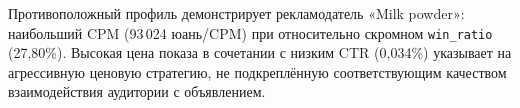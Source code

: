Противоположный профиль демонстрирует рекламодатель «Milk powder»: наибольший CPM (93\,024 юань/CPM) при относительно скромном \texttt{win\_ratio} (27,80\%). Высокая цена показа в сочетании с низким CTR (0,034\%) указывает на агрессивную ценовую стратегию, не подкреплённую соответствующим качеством взаимодействия аудитории с объявлением.

